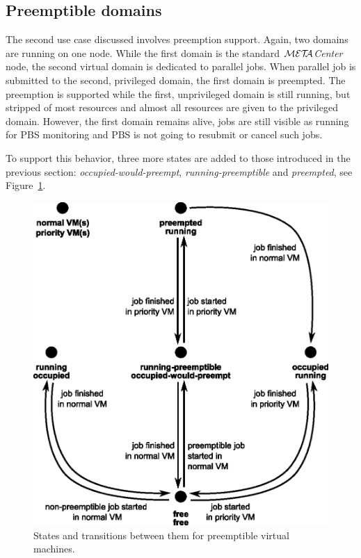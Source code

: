 \documentclass{sig-alternate}
\def\META#1{\textit{${\cal MET\!\!A}$#1}}
\begin{document}
\subsection{Preemptible domains}

The second use case discussed involves preemption support. Again, 
two domains are running on one node. While the first domain is the
standard \META{Center} node, 
the second virtual domain is dedicated to parallel jobs. When parallel job
is submitted to the second, privileged domain, 
the first domain is preempted. The preemption is supported while the first,
unprivileged domain is still running, but stripped of most resources and 
almost all resources are given to the privileged domain. However,
the first domain remains alive, jobs are still visible as running for PBS
monitoring and PBS is not going to resubmit or cancel such jobs.

To support this behavior, three more states are added to those
introduced in the previous section: \textit{occupied-would-preempt},
\textit{running-preemptible} and \textit{preempted}, see
Figure~\ref{fig:preemption}.

\begin{figure}[tb]
    \includegraphics[width=\columnwidth]{preemption}
    \caption{States and transitions between them for preemptible
        virtual machines.}
    \label{fig:preemption}
\end{figure}
\end{document}
